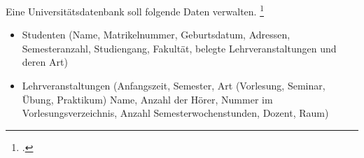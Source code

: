 \documentclass{bschlangaul-aufgabe}
\begin{document}

Eine Universitätsdatenbank soll folgende Daten verwalten.
\footcite[Seite 219-221]{bloechl}

\begin{itemize}

\item Studenten (Name, Matrikelnummer, Geburtsdatum, Adressen,
Semesteranzahl, Studiengang, Fakultät, belegte Lehrveranstaltungen und
deren Art)

\item Lehrveranstaltungen (Anfangszeit, Semester, Art (Vorlesung,
Seminar, Übung, Praktikum) Name, Anzahl der Hörer, Nummer im
Vorlesungsverzeichnis, Anzahl Semesterwochenstunden, Dozent, Raum)
\end{itemize}
\end{document}
